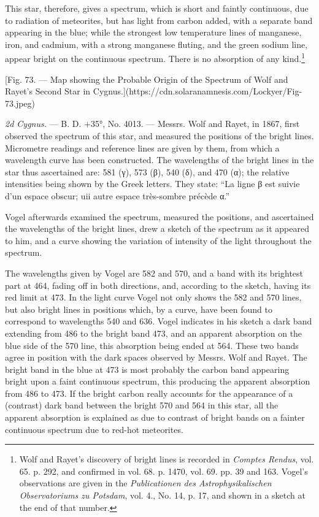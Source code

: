 \documentclass[a4paper, 12pt, oneside, polutonikogreek, english]{article}
\begin{document}
This star, therefore, gives a spectrum, which is short and faintly continuous, due to radiation of meteorites, but has light from carbon added, with a separate band appearing in the blue; while the strongest low temperature lines of manganese, iron, and cadmium, with a strong manganese fluting, and the green sodium line, appear bright on the continuous spectrum. There is no absorption of any kind.\footnote{Wolf and Rayet's discovery of bright lines is recorded in \emph{Comptes Rendus}, vol. 65. p. 292, and confirmed in vol. 68. p. 1470, vol. 69. pp. 39 and 163. Vogel's observations are given in the \emph{Publicationen des Astrophysikalischen Observatoriums zu Potsdam}, vol. 4., No. 14, p. 17, and shown in a sketch at the end of that number.}

[Fig. 73. --- Map showing the Probable Origin of the Spectrum of Wolf and Rayet's Second Star in Cygnus.](https://cdn.solaranamnesis.com/Lockyer/Fig-73.jpeg)

\emph{2d Cygnus.} --- B. D. +35°, No. 4013. --- Messrs. Wolf and Rayet, in 1867, first observed the spectrum of this star, and measured the positions of the bright lines. Micrometre readings and reference lines are given by them, from which a wavelength curve has been constructed. The wavelengths of the bright lines in the star thus ascertained are: 581 (γ), 573 (β), 540 (δ), and 470 (α); the relative intensities being shown by the Greek letters. They state: ``La ligne β est suivie d'un espace obscur; uii autre espace très-sombre précède α.''

Vogel afterwards examined the spectrum, measured the positions, and ascertained the wavelengths of the bright lines, drew a sketch of the spectrum as it appeared to him, and a curve showing the variation of intensity of the light throughout the spectrum.

The wavelengths given by Vogel are 582 and 570, and a band with its brightest part at 464, fading off in both directions, and, according to the sketch, having its red limit at 473. In the light curve Vogel not only shows the 582 and 570 lines, but also bright lines in positions which, by a curve, have been found to correspond to wavelengths 540 and 636. Vogel indicates in his sketch a dark band extending from 486 to the bright band 473, and an apparent absorption on the blue side of the 570 line, this absorption being ended at 564. These two bands agree in position with the dark spaces observed by Messrs. Wolf and Rayet. The bright band in the blue at 473 is most probably the carbon band appearing bright upon a faint continuous spectrum, this producing the apparent absorption from 486 to 473. If the bright carbon really accounts for the appearance of a (contrast) dark band between the bright 570 and 564 in this star, all the apparent absorption is explained as due to contrast of bright bands on a fainter continuous spectrum due to red-hot meteorites.
\end{document}
